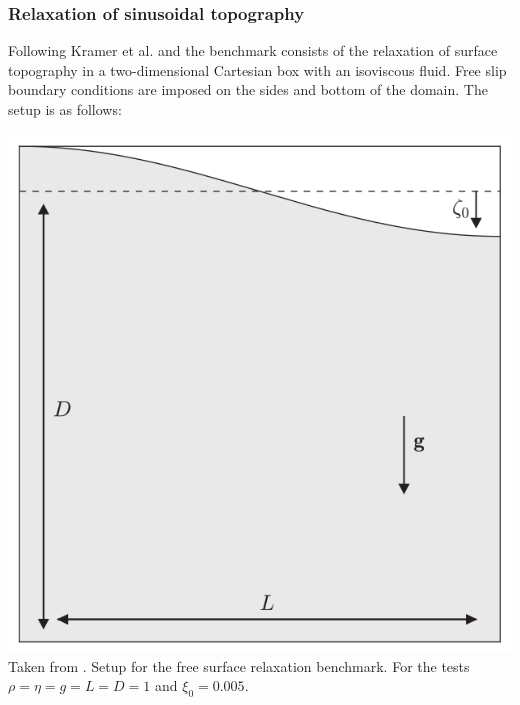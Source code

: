 
\subsubsection{Relaxation of sinusoidal topography}

Following Kramer et al. \cite[Section 3.1.1]{krwd12} and \cite{robh17} 
the benchmark consists of the relaxation of surface topography in a 
two-dimensional Cartesian box with an isoviscous fluid. 
Free slip boundary conditions are imposed on the sides and bottom of the domain.
The setup is as follows:

\begin{center}
\begin{minipage}{0.45\textwidth}
\centering
\includegraphics[height=0.8\textwidth]{images/benchmark_relaxation/robh17}\\
{\captionfont Taken from \cite{robh17}. Setup for the free surface relaxation benchmark.
For the tests $\rho=\eta=g=L=D=1$ and $\xi_0=0.005$.}
\end{minipage}\hfill
\begin{minipage}{0.45\textwidth}
\centering

\end{minipage}
\end{center}
